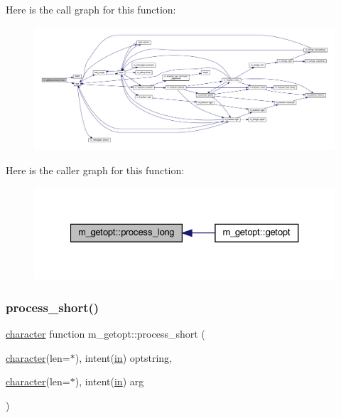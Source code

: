 Here is the call graph for this function\+:
\nopagebreak
\begin{figure}[H]
\begin{center}
\leavevmode
\includegraphics[width=350pt]{namespacem__getopt_a47714553b3cda11df4d21bc343760d9c_cgraph}
\end{center}
\end{figure}
Here is the caller graph for this function\+:
\nopagebreak
\begin{figure}[H]
\begin{center}
\leavevmode
\includegraphics[width=327pt]{namespacem__getopt_a47714553b3cda11df4d21bc343760d9c_icgraph}
\end{center}
\end{figure}
\mbox{\label{namespacem__getopt_a5a41350043ae3b92dbbac7dea6702e09}} 
\subsubsection{\texorpdfstring{process\+\_\+short()}{process\_short()}}
{\footnotesize\ttfamily \hyperlink{option__stopwatch_83_8txt_abd4b21fbbd175834027b5224bfe97e66}{character} function m\+\_\+getopt\+::process\+\_\+short (\begin{DoxyParamCaption}\item[{\hyperlink{option__stopwatch_83_8txt_abd4b21fbbd175834027b5224bfe97e66}{character}(len=$\ast$), intent(\hyperlink{M__journal_83_8txt_afce72651d1eed785a2132bee863b2f38}{in})}]{optstring,  }\item[{\hyperlink{option__stopwatch_83_8txt_abd4b21fbbd175834027b5224bfe97e66}{character}(len=$\ast$), intent(\hyperlink{M__journal_83_8txt_afce72651d1eed785a2132bee863b2f38}{in})}]{arg }\end{DoxyParamCaption})}



